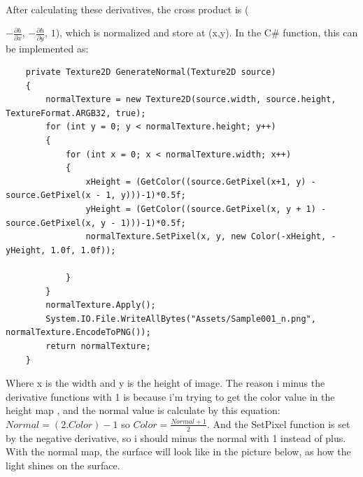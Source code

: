 \documentclass[a4paper, 13pt]{extarticle}
\begin{document}
\\[0.2cm] After calculating these derivatives, the cross product is ({$-\frac{\partial h}{\partial x}$, $-\frac{\partial h}{\partial y}$, $1$), which is normalized and store at (x,y). In the C\# function, this can be implemented as: \begin{lstlisting}
	private Texture2D GenerateNormal(Texture2D source)
	{
		normalTexture = new Texture2D(source.width, source.height, TextureFormat.ARGB32, true);
		for (int y = 0; y < normalTexture.height; y++)
		{
			for (int x = 0; x < normalTexture.width; x++)
			{
				xHeight = (GetColor((source.GetPixel(x+1, y) - source.GetPixel(x - 1, y)))-1)*0.5f;
				yHeight = (GetColor((source.GetPixel(x, y + 1) - source.GetPixel(x, y - 1)))-1)*0.5f;
				normalTexture.SetPixel(x, y, new Color(-xHeight, -yHeight, 1.0f, 1.0f));
	
			}
		}
		normalTexture.Apply();
		System.IO.File.WriteAllBytes("Assets/Sample001_n.png", normalTexture.EncodeToPNG());
		return normalTexture;
	}
	\end{lstlisting}
 Where x is the width and y is the height of image. The reason i minus the derivative functions with 1 is because i'm trying to get the color value in the height map , and the normal value is calculate by this equation: $ Normal = (2.Color) - 1 $ so $ Color = \frac{Normal + 1}{2}$. And the SetPixel function is set by the negative derivative, so i should minus the normal with 1 instead of plus. With the normal map, the surface will look like in the picture below, as how the light shines on the surface.
 
}
\end{document}
